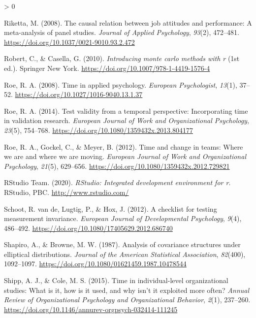 \documentclass[
12pt, %
twoside,
english]{guelphthesis}
\newlength{\cslhangindent}
\newenvironment{CSLReferences}[2] %
 {%
  \setlength{\parindent}{0pt}
  \ifodd #1 \everypar{\setlength{\hangindent}{\cslhangindent}}\ignorespaces\fi
  \ifnum #2 > 0
  \setlength{\parskip}{\linespacing{2}}
  \fi
 }%
 {}
\theoremstyle{definition}
\theoremstyle{definition}
\theoremstyle{definition}
\theoremstyle{definition}
\theoremstyle{remark}
\begin{document}
\begin{CSLReferences}{1}{0}
\leavevmode{}%
Riketta, M. (2008). The causal relation between job attitudes and performance: A meta-analysis of panel studies. \emph{Journal of Applied Psychology}, \emph{93}(2), 472--481. \url{https://doi.org/10.1037/0021-9010.93.2.472}

\leavevmode{}%
Robert, C., \& Casella, G. (2010). \emph{Introducing monte carlo methods with r} (1st ed.). Springer New York. \url{https://doi.org/10.1007/978-1-4419-1576-4}

\leavevmode{}%
Roe, R. A. (2008). Time in applied psychology. \emph{European Psychologist}, \emph{13}(1), 37--52. \url{https://doi.org/10.1027/1016-9040.13.1.37}

\leavevmode{}%
Roe, R. A. (2014). Test validity from a temporal perspective: Incorporating time in validation research. \emph{European Journal of Work and Organizational Psychology}, \emph{23}(5), 754--768. \url{https://doi.org/10.1080/1359432x.2013.804177}

\leavevmode{}%
Roe, R. A., Gockel, C., \& Meyer, B. (2012). Time and change in teams: Where we are and where we are moving. \emph{European Journal of Work and Organizational Psychology}, \emph{21}(5), 629--656. \url{https://doi.org/10.1080/1359432x.2012.729821}

\leavevmode{}%
RStudio Team. (2020). \emph{RStudio: Integrated development environment for r}. RStudio, PBC. \url{http://www.rstudio.com/}

\leavevmode{}%
Schoot, R. van de, Lugtig, P., \& Hox, J. (2012). A checklist for testing measurement invariance. \emph{European Journal of Developmental Psychology}, \emph{9}(4), 486--492. \url{https://doi.org/10.1080/17405629.2012.686740}

\leavevmode{}%
Shapiro, A., \& Browne, M. W. (1987). Analysis of covariance structures under elliptical distributions. \emph{Journal of the American Statistical Association}, \emph{82}(400), 1092--1097. \url{https://doi.org/10.1080/01621459.1987.10478544}

\leavevmode{}%
Shipp, A. J., \& Cole, M. S. (2015). Time in individual-level organizational studies: What is it, how is it used, and why isn{'}t it exploited more often? \emph{Annual Review of Organizational Psychology and Organizational Behavior}, \emph{2}(1), 237--260. \url{https://doi.org/10.1146/annurev-orgpsych-032414-111245}


\end{CSLReferences}
\end{document}
